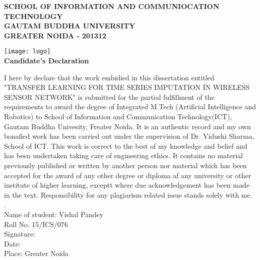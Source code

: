 \thispagestyle{plain}
\begin{center}

	\normalsize
	\textbf{SCHOOL OF INFORMATION AND COMMUNIOCATION TECHNOLOGY}\\
	\textbf{GAUTAM BUDDHA UNIVERSITY}\\
	\textbf{GREATER NOIDA - 201312}

	\vspace{0.5cm}

	\texttt{[image: logo]}\\
	\Large
	\textbf{Candidate's Declaration}

\end{center}

\normalsize
I here by declare that the work embidied in this dissertation entitled "TRANSFER LEARNING FOR TIME SERIES IMPUTATION IN WIRELESS SENSOR NETWORK" is submitted for the partial fulfillment of the requirements to award the degree of Integrated M.Tech (Artificial Intelligence and Robotics) to School of Information and Communication Technology(ICT), Gautam Buddha Univesity, Freater Noida. It is an authentic record and my own bonafied work has been carried out under the supervision of Dr. Vidushi Sharma, School of ICT. This work is correct to the best of my knowledge and belief and has been undertaken taking care of engineering ethics. It contains no material previously published or written by another person nor material which has been accepted for the award of any other degree or diploma af any university or other institute of higher learning, exceptt where due acknowledgement has been made in the text. Responsibility for any plagiarism related issue stands solely with me.\\

.\\
Name of student: Vishal Pandey\\
Roll No. 15/ICS/076\\
Signature:\\
Date: \\
Place: Greater Noida\\
